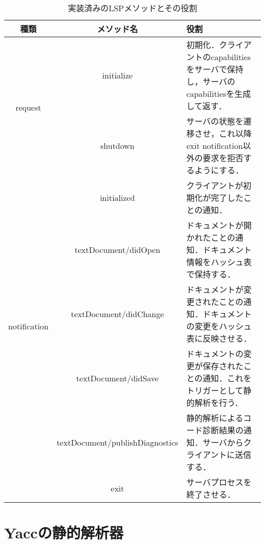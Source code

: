 \documentclass[fontsize=9bp,twocolumn,column_gap=2.36zw,a4paper,report]{jlreq}
\begin{document}
\begin{table*}[h]
	\caption{実装済みのLSPメソッドとその役割}\label{tbl:lsp_method}
	\small
	\centering
	\begin{tabularx}{\linewidth}{|c|c|X|}
		\hline
		種類 & メソッド名& 役割 \\
		\hline\hline
		\multirow{2}{*}{request} & initialize & 初期化．クライアントのcapabilitiesをサーバで保持し，サーバのcapabilitiesを生成して返す． \\
		& shutdown & サーバの状態を遷移させ，これ以降exit notification以外の要求を拒否するようにする． \\
		\hline
		\multirow{5}{*}{notification} & initialized & クライアントが初期化が完了したことの通知． \\
		& textDocument/didOpen & ドキュメントが開かれたことの通知．ドキュメント情報をハッシュ表で保持する． \\
		& textDocument/didChange & ドキュメントが変更されたことの通知．ドキュメントの変更をハッシュ表に反映させる． \\
		& textDocument/didSave & ドキュメントの変更が保存されたことの通知．これをトリガーとして静的解析を行う． \\
		& textDocument/publishDiagnostics & 静的解析によるコード診断結果の通知．サーバからクライアントに送信する． \\
		& exit & サーバプロセスを終了させる． \\
		\hline
	\end{tabularx}
\end{table*}

\section{Yaccの静的解析器}
\end{document}
